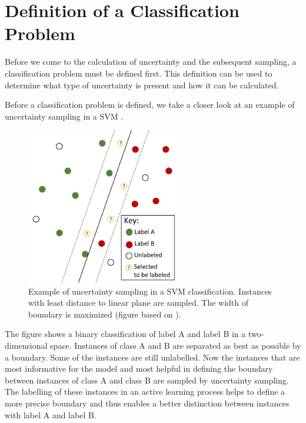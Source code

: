 \section{Definition of a Classification Problem}
\label{sec:definition_of_a_classification_problem}

Before we come to the calculation of uncertainty and the subsequent sampling, a classification problem must be defined first.
This definition can be used to determine what type of uncertainty is present and how it can be calculated.

Before a classification problem is defined, we take a closer look at an example of uncertainty sampling in a \ac{SVM} .
\begin{figure}[t]
  \centering
    \includegraphics[width=0.6\textwidth]{figures/SVM.pdf}
  \caption{Example of uncertainty sampling in a \ac{SVM} classification. Instances with least distance to linear plane are sampled.
  The width of boundary is maximized  (figure based on \cite{human-in-the-loop}).}
  \label{fig:svm}
\end{figure}
The figure shows a binary classification of label A and label B in a two-dimensional space.
Instances of class A and B are separated as best as possible by a boundary.
Some of the instances are still unlabelled.
Now the instances that are most informative for the model and most helpful in defining the boundary between instances of class A and class B are sampled by uncertainty sampling.
The labelling of these instances in an active learning process helps to define a more precise boundary and thus enables a better distinction between instances with label A and label B.

